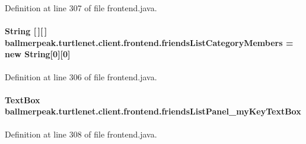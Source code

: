 Definition at line 307 of file frontend.\-java.

\hypertarget{classballmerpeak_1_1turtlenet_1_1client_1_1frontend_a5f5b375a148f003db1813758020730d6}{
\paragraph[{friends\-List\-Category\-Members}]{\setlength{\rightskip}{0pt plus 5cm}String \mbox{[}$\,$\mbox{]}\mbox{[}$\,$\mbox{]} ballmerpeak.\-turtlenet.\-client.\-frontend.\-friends\-List\-Category\-Members = new String\mbox{[}0\mbox{]}\mbox{[}0\mbox{]}\hspace{0.3cm}{\ttfamily [package]}}}\label{classballmerpeak_1_1turtlenet_1_1client_1_1frontend_a5f5b375a148f003db1813758020730d6}


Definition at line 306 of file frontend.\-java.

\hypertarget{classballmerpeak_1_1turtlenet_1_1client_1_1frontend_a342dab1f72f4cf1660ec756f4180b331}{
\paragraph[{friends\-List\-Panel\-\_\-my\-Key\-Text\-Box}]{\setlength{\rightskip}{0pt plus 5cm}Text\-Box ballmerpeak.\-turtlenet.\-client.\-frontend.\-friends\-List\-Panel\-\_\-my\-Key\-Text\-Box\hspace{0.3cm}{\ttfamily [private]}}}\label{classballmerpeak_1_1turtlenet_1_1client_1_1frontend_a342dab1f72f4cf1660ec756f4180b331}


Definition at line 308 of file frontend.\-java.

